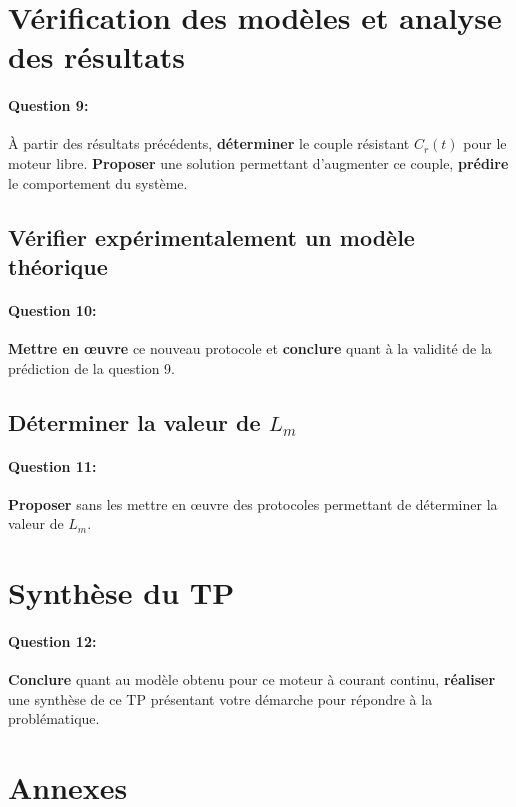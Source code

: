 \section{Vérification des modèles et analyse des résultats}

\paragraph{Question 9:} À partir des résultats précédents, \textbf{déterminer} le couple résistant $C_r(t)$ pour le moteur libre. \textbf{Proposer} une solution permettant d'augmenter ce couple, \textbf{prédire} le comportement du système.

\subsection{Vérifier expérimentalement un modèle théorique}

\paragraph{Question 10:} \textbf{Mettre en \oe uvre} ce nouveau protocole et \textbf{conclure} quant à la validité de la prédiction de la question 9.

\subsection{Déterminer la valeur de $L_m$}

\paragraph{Question 11:} \textbf{Proposer} sans les mettre en \oe uvre des protocoles permettant de déterminer la valeur de $L_m$.

\section{Synthèse du TP}

\paragraph{Question 12:} \textbf{Conclure} quant au modèle obtenu pour ce moteur à courant continu, \textbf{réaliser} une synthèse de ce TP présentant votre démarche pour répondre à la problématique.

\section{Annexes}

